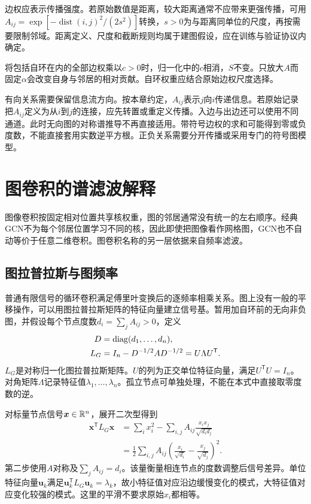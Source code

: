 边权应表示传播强度。若原始数值是距离，较大距离通常不应带来更强传播，可用$A_{ij}=\exp[-\operatorname{dist}(i,j)^2/(2s^2)]$转换，$s>0$为与距离同单位的尺度，再按需要限制邻域。距离定义、尺度和截断规则均属于建图假设，应在训练与验证协议内确定。

将包括自环在内的全部边权乘以$c>0$时，归一化中的$c$相消，$S$不变。只放大$A$而固定$\alpha$会改变自身与邻居的相对贡献。自环权重应结合原始边权尺度选择。

有向关系需要保留信息流方向。按本章约定，$A_{ij}$表示$j$向$i$传递信息。若原始记录把$A_{ij}$定义为从$i$到$j$的连接，应先转置或重定义传播。入边与出边还可以使用不同通道。此时无向图的对称谱推导不再直接适用。带符号边权的求和可能得到零或负度数，不能直接套用实数逆平方根。正负关系需要分开传播或采用专门的符号图模型。

\section{图卷积的谱滤波解释}
图像卷积按固定相对位置共享核权重，图的邻居通常没有统一的左右顺序。经典GCN不为每个邻居位置学习不同的核，因此即使把图像看作网格图，GCN也不自动等价于任意二维卷积。图卷积名称的另一层依据来自频率滤波。

\subsection{图拉普拉斯与图频率}
普通有限信号的循环卷积满足傅里叶变换后的逐频率相乘关系。图上没有一般的平移操作，可以用图拉普拉斯矩阵的特征向量建立信号基。暂用加自环前的无向非负图，并假设每个节点度数$d_i=\sum_jA_{ij}>0$，定义
\begin{equation}
 \begin{aligned}
 D&=\operatorname{diag}(d_1,\ldots,d_n),\\
 L_G&=I_n-D^{-1/2}AD^{-1/2}=U\Lambda U^{\mathsf T}.
 \end{aligned}
 \label{eq:graph-laplacian}
\end{equation}
$L_G$是对称归一化图拉普拉斯矩阵。$U$的列为正交单位特征向量，满足$U^{\mathsf T}U=I_n$。对角矩阵$\Lambda$记录特征值$\lambda_1,\ldots,\lambda_n$。孤立节点可单独处理，不能在本式中直接取零度数的逆。

对标量节点信号$\bm x\in\mathbb{R}^n$，展开二次型得到
\begin{align}
 \bm x^{\mathsf T}L_G\bm x
 &=\sum_i x_i^2-\sum_{i,j}A_{ij}\frac{x_ix_j}{\sqrt{d_id_j}}\\
 &=\frac12\sum_{i,j}A_{ij}\left(\frac{x_i}{\sqrt{d_i}}-\frac{x_j}{\sqrt{d_j}}\right)^2.
 \label{eq:graph-smoothness}
\end{align}
第二步使用$A$对称及$\sum_jA_{ij}=d_i$。该量衡量相连节点的度数调整后信号差异。单位特征向量$\bm u_k$满足$\bm u_k^{\mathsf T}L_G\bm u_k=\lambda_k$，故小特征值对应沿边缓慢变化的模式，大特征值对应变化较强的模式。这里的平滑不要求原始$x_i$都相等。

